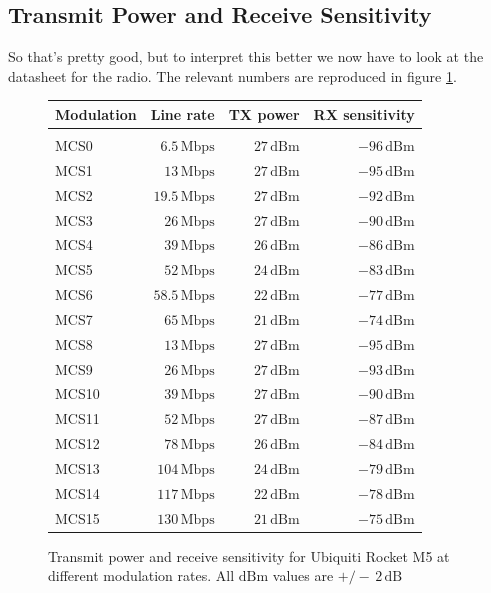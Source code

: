 \subsection{Transmit Power and Receive Sensitivity}
So that's pretty good, but to interpret this better we now have to
look at the datasheet for the radio. The relevant numbers are
reproduced in figure \ref{fig:rocket_txrx}.
\begin{figure}[h]
  \begin{center}
    \begin{tabular}{lrrr}
      Modulation & Line rate & TX power & RX sensitivity\\
      \hline\\
      MCS0 & $6.5\, \mathrm{Mbps}$ & $27\, \mathrm{dBm}$ & $-96\,\mathrm{dBm}$\\
      MCS1 & $13\, \mathrm{Mbps}$ & $27\, \mathrm{dBm}$ & $-95\,\mathrm{dBm}$\\
      MCS2 & $19.5\, \mathrm{Mbps}$ & $27\, \mathrm{dBm}$ & $-92\,\mathrm{dBm}$\\
      MCS3 & $26\, \mathrm{Mbps}$ & $27\, \mathrm{dBm}$ & $-90\,\mathrm{dBm}$\\
      MCS4 & $39\, \mathrm{Mbps}$ & $26\, \mathrm{dBm}$ & $-86\,\mathrm{dBm}$\\
      MCS5 & $52\, \mathrm{Mbps}$ & $24\, \mathrm{dBm}$ & $-83\,\mathrm{dBm}$\\
      MCS6 & $58.5\, \mathrm{Mbps}$ & $22\, \mathrm{dBm}$ & $-77\,\mathrm{dBm}$\\
      MCS7 & $65\, \mathrm{Mbps}$ & $21\, \mathrm{dBm}$ & $-74\,\mathrm{dBm}$\\
      MCS8 & $13\, \mathrm{Mbps}$ & $27\, \mathrm{dBm}$ & $-95\,\mathrm{dBm}$\\
      MCS9 & $26\, \mathrm{Mbps}$ & $27\, \mathrm{dBm}$ & $-93\,\mathrm{dBm}$\\
      MCS10 & $39\, \mathrm{Mbps}$ & $27\, \mathrm{dBm}$ & $-90\,\mathrm{dBm}$\\
      MCS11 & $52\, \mathrm{Mbps}$ & $27\, \mathrm{dBm}$ & $-87\,\mathrm{dBm}$\\
      MCS12 & $78\, \mathrm{Mbps}$ & $26\, \mathrm{dBm}$ & $-84\,\mathrm{dBm}$\\
      MCS13 & $104\, \mathrm{Mbps}$ & $24\, \mathrm{dBm}$ & $-79\,\mathrm{dBm}$\\
      MCS14 & $117\, \mathrm{Mbps}$ & $22\, \mathrm{dBm}$ & $-78\,\mathrm{dBm}$\\
      MCS15 & $130\, \mathrm{Mbps}$ & $21\, \mathrm{dBm}$ & $-75\,\mathrm{dBm}$\\
    \end{tabular}
  \end{center}
  \caption{Transmit power and receive sensitivity for Ubiquiti Rocket
    M5 at different modulation rates. All $\mathrm{dBm}$ values are
    $+/-\, 2\, \mathrm{dB}$}
  \label{fig:rocket_txrx}
\end{figure}


